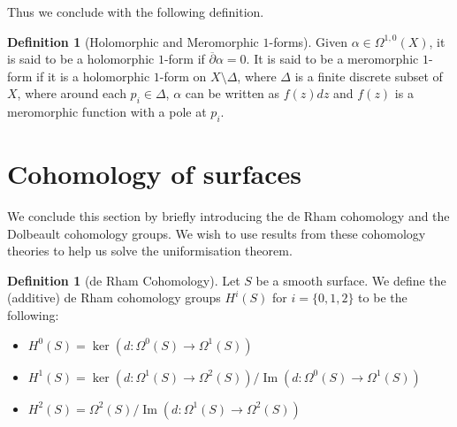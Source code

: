 \documentclass[11pt]{report}
\theoremstyle{definition}
\newtheorem{defn}[thm]{Definition}
\DeclareMathOperator{\im}{Im}
\begin{document}
Thus we conclude with the following definition.
\begin{defn}[Holomorphic and Meromorphic $1$-forms]
  Given $\alpha \in \Omega^{1,0}(X)$, it is said to be a holomorphic $1$-form if $\overline{\partial} \alpha = 0$. It is said to be a meromorphic $1$-form if it is a holomorphic $1$-form on $X\setminus \Delta$, where $\Delta$ is a finite discrete subset of $X$, where around each $p_i \in \Delta$, $\alpha$ can be written as $f(z)dz$ and $f(z)$ is a meromorphic function with a pole at $p_i$.
\end{defn}

\section{Cohomology of surfaces}
We conclude this section by briefly introducing the de Rham cohomology and the Dolbeault cohomology groups. We wish to use results from these cohomology theories to help us solve the uniformisation theorem.
\begin{defn}[de Rham Cohomology]\label{deRham}
  Let $S$ be a smooth surface. We define the (additive) de Rham cohomology groups $H^i(S)$ for $i=\{0,1,2\}$ to be the following:
  \begin{itemize}
    \item $H^0(S)=\ker(d:\Omega^0(S)\rightarrow\Omega^1(S))$
    \item $H^1(S)=\ker(d:\Omega^1(S)\rightarrow\Omega^2(S))/\im(d:\Omega^0(S)\rightarrow \Omega^1(S))$
    \item $H^2(S)=\Omega^2(S)/\im(d:\Omega^1(S)\rightarrow \Omega^2(S))$
  \end{itemize}
\end{defn}
\end{document}
